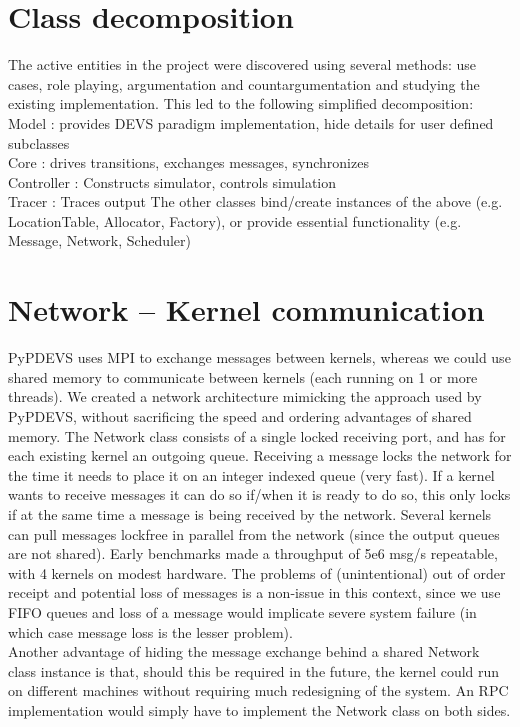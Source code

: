 \documentclass[8pt,a4paper]{report}
\begin{document}
\section{Class decomposition}
The active entities in the project were discovered using several methods: use cases, role playing, argumentation and countargumentation and studying the existing implementation. This led to the following simplified decomposition:
\\ Model : provides DEVS paradigm implementation, hide details for user defined subclasses
\\ Core : drives transitions, exchanges messages, synchronizes
\\ Controller : Constructs simulator, controls simulation
\\ Tracer : Traces output
The other classes bind/create instances of the above (e.g. LocationTable, Allocator, Factory), or provide essential functionality (e.g. Message, Network, Scheduler)

\section{Network -- Kernel communication}
PyPDEVS uses MPI to exchange messages between kernels, whereas we could use shared memory to communicate between kernels (each running on 1 or more threads). We created a network architecture mimicking the approach used by PyPDEVS, without sacrificing the speed and ordering advantages of shared memory. The Network class consists of a single locked receiving port, and has for each existing kernel an outgoing queue. Receiving a message locks the network for the time it needs to place it on an integer indexed queue (very fast). If a kernel wants to receive messages it can do so if/when it is ready to do so, this only locks if at the same time a message is being received by the network. Several kernels can pull messages lockfree in parallel from the network (since the output queues are not shared). Early benchmarks made a throughput of 5e6 msg/s repeatable, with 4 kernels on modest hardware. The problems of (unintentional) out of order receipt and potential loss of messages is a non-issue in this context, since we use FIFO queues and loss of a message would implicate severe system failure (in which case message loss is the lesser problem).\\
Another advantage of hiding the message exchange behind a shared Network class instance is that, should this be required in the future, the kernel could run on different machines without requiring much redesigning of the system. An RPC implementation would simply have to implement the Network class on both sides.
\end{document}
